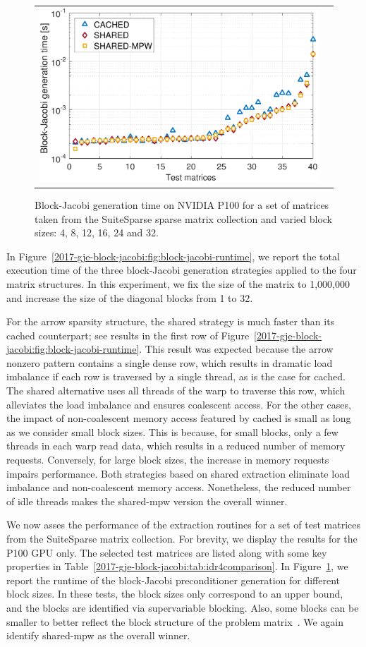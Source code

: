 \begin{figure}
\begin{center}
{\begin{tabular}{cc}
\includegraphics[width=.46\columnwidth]{plots/BJ_generation_time_32.pdf}\\
\end{tabular}
}
\end{center}
\caption{
Block-Jacobi generation time on NVIDIA P100
for a set of matrices taken from the SuiteSparse sparse matrix collection and varied 
block sizes: 4, 8, 12, 16, 24 and 32.
}
\label{2017-gje-block-jacobi:fig:block-jacobi-suitsparse}
\end{figure}


In Figure~\ref{2017-gje-block-jacobi:fig:block-jacobi-runtime}, we report the total execution time of
the three block-Jacobi generation strategies applied to the four matrix
structures. In this experiment, we fix the size of the matrix to 1,000,000 and
increase the size of the diagonal blocks from 1 to 32.

For the arrow sparsity structure, the {\sc shared} strategy is much faster than
its {\sc cached} counterpart; see results in the first row of
Figure~\ref{2017-gje-block-jacobi:fig:block-jacobi-runtime}. This result was expected because the arrow nonzero
pattern contains a single dense row, which results in dramatic load imbalance if
each row is traversed by a single thread, as is the case for {\sc cached}. The
{\sc shared} alternative uses all threads of the warp to traverse this row,
which alleviates the load imbalance and ensures coalescent access. For the other
cases, the impact of non-coalescent memory access featured by {\sc cached} is
small as long as we consider small block sizes. This is because, for small
blocks, only a few threads in each warp read data, which results in a reduced number
of memory requests. Conversely, for large block sizes, the increase in memory
requests impairs performance. Both strategies based on shared extraction
eliminate load imbalance and non-coalescent memory access. Nonetheless, the
reduced number of idle threads makes the {\sc shared-mpw} version the overall
winner.

We now asses the performance of the extraction routines for a set of test
matrices from the SuiteSparse matrix collection. For brevity, we display the
results for the P100 GPU only. The selected test matrices are listed along with
some key properties in Table~\ref{2017-gje-block-jacobi:tab:idr4comparison}. In
Figure~\ref{2017-gje-block-jacobi:fig:block-jacobi-suitsparse}, we report the runtime of the
block-Jacobi preconditioner generation for different block sizes. In these
tests, the block sizes only correspond to an upper bound, and the blocks are
identified via supervariable blocking. Also, some blocks can be smaller to better
reflect the block structure of the problem matrix~\cite{chow-scott-2016}. We
again identify {\sc shared-mpw} as the overall winner.


